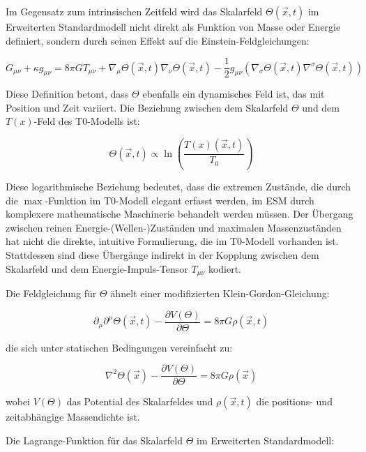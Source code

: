 \documentclass[12pt,a4paper]{article}
\newcommand{\Tfield}{T(x)}
\newcommand{\Tzero}{T_0}
\newcommand{\vecx}{\vec{x}}
\begin{document}
	Im Gegensatz zum intrinsischen Zeitfeld wird das Skalarfeld \(\Theta(\vecx,t)\) im Erweiterten Standardmodell nicht direkt als Funktion von Masse oder Energie definiert, sondern durch seinen Effekt auf die Einstein-Feldgleichungen:
	
	\begin{equation}
		G_{\mu\nu} + \kappa g_{\mu\nu} = 8\pi G T_{\mu\nu} + \nabla_{\mu}\Theta(\vecx,t)\nabla_{\nu}\Theta(\vecx,t) - \frac{1}{2}g_{\mu\nu}(\nabla_{\sigma}\Theta(\vecx,t)\nabla^{\sigma}\Theta(\vecx,t))
	\end{equation}
	
	Diese Definition betont, dass \(\Theta\) ebenfalls ein dynamisches Feld ist, das mit Position und Zeit variiert. Die Beziehung zwischen dem Skalarfeld \(\Theta\) und dem \(\Tfield\)-Feld des T0-Modells ist:
	
	\begin{equation}
		\Theta(\vecx,t) \propto \ln\left(\frac{\Tfield(\vecx,t)}{\Tzero}\right)
	\end{equation}
	
	Diese logarithmische Beziehung bedeutet, dass die extremen Zustände, die durch die \(\max\)-Funktion im T0-Modell elegant erfasst werden, im ESM durch komplexere mathematische Maschinerie behandelt werden müssen. Der Übergang zwischen reinen Energie-(Wellen-)Zuständen und maximalen Massenzuständen hat nicht die direkte, intuitive Formulierung, die im T0-Modell vorhanden ist. Stattdessen sind diese Übergänge indirekt in der Kopplung zwischen dem Skalarfeld und dem Energie-Impuls-Tensor \(T_{\mu\nu}\) kodiert.
	
	Die Feldgleichung für \(\Theta\) ähnelt einer modifizierten Klein-Gordon-Gleichung:
	
	\begin{equation}
		\partial_{\mu}\partial^{\mu}\Theta(\vecx,t) - \frac{\partial V(\Theta)}{\partial \Theta} = 8\pi G \rho(\vecx,t)
	\end{equation}
	
	die sich unter statischen Bedingungen vereinfacht zu:
	
	\begin{equation}
		\nabla^2 \Theta(\vecx) - \frac{\partial V(\Theta)}{\partial \Theta} = 8\pi G \rho(\vecx)
	\end{equation}
	
	wobei \(V(\Theta)\) das Potential des Skalarfeldes und \(\rho(\vecx,t)\) die positions- und zeitabhängige Massendichte ist.
	
	Die Lagrange-Funktion für das Skalarfeld \(\Theta\) im Erweiterten Standardmodell:
	
\end{document}
